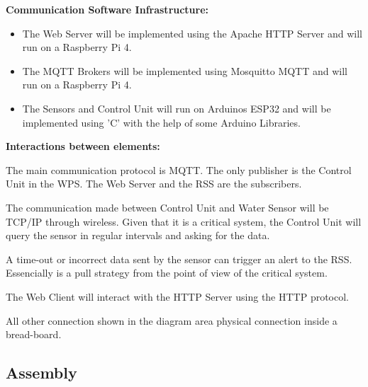 \documentclass[11pt]{article}
\begin{document}
\textbf{Communication Software Infrastructure:}

\begin{itemize}
	\item The Web Server will be implemented using the Apache HTTP Server and will run on a Raspberry Pi 4.
	\item The MQTT Brokers will be implemented using Mosquitto MQTT and will run on a Raspberry Pi 4.
	\item The Sensors and Control Unit will run on Arduinos ESP32 and will be implemented using 'C' with the help of some Arduino Libraries. 
\end{itemize}

\textbf{Interactions between elements:}

The main communication protocol is MQTT. The only publisher is the Control Unit in the WPS. The Web Server and the RSS are the subscribers.

The communication made between Control Unit and Water Sensor will be TCP/IP through wireless. Given that it is a critical system, the Control Unit will query the sensor in regular intervals and asking for the data.

A time-out or incorrect data sent by the sensor can trigger an alert to the RSS. Essencially is a pull strategy from the point of view of the critical system.

The Web Client will interact with the HTTP Server using the HTTP protocol.

All other connection shown in the diagram area physical connection inside a bread-board.


\subsection{Assembly}
\end{document}
